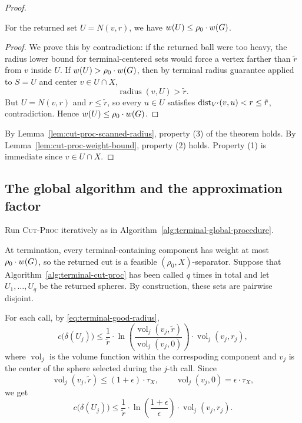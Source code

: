 \begin{proof}
\begin{lemma}\label{lem:cut-proc-weight-bound}
For the returned set $U=N(v,r)$,  we have $w\mathopen{}\left( U \right)\le \rho_0\cdot w\mathopen{}\left( G \right)$.
\end{lemma}
\begin{proof}
We prove this by contradiction: if the returned ball were too heavy, the radius lower bound for terminal-centered sets would force a vertex farther than $\tilde r$ from $v$ inside $U$.
If $w\mathopen{}\left( U \right)>\rho_0\cdot w\mathopen{}\left( G \right)$, then by terminal radius guarantee applied to $S=U$ and center $v\in U\cap X$,
\[
\operatorname{radius}(v,U)>\tilde r.
\]
But $U=N(v,r)$ and $r\le \tilde r$, so every $u\in U$ satisfies $\text{dist}_{V'}(v,u)<r\le \tilde r$, contradiction.
Hence $w\mathopen{}\left( U \right)\le \rho_0\cdot w\mathopen{}\left( G \right)$.
\end{proof}

By Lemma~\ref{lem:cut-proc-scanned-radius}, property (3) of the theorem holds. By Lemma~\ref{lem:cut-proc-weight-bound}, property (2) holds. Property (1) is immediate since $v\in U\cap X$.
\end{proof}

\subsection{The global algorithm and the approximation factor}

Run \textsc{Cut-Proc} iteratively as in Algorithm~\ref{alg:terminal-global-procedure}.



At termination, every terminal-containing component has weight at most $\rho_0\cdot w\mathopen{}\left( G \right)$, so the returned cut is a feasible $(\rho_0,X)$-separator.
Suppose that Algorithm~\ref{alg:terminal-cut-proc} has been called $q$ times in total and let $U_1,\dots,U_q$ be the returned spheres.
By construction, these sets are pairwise disjoint.

For each call, by \eqref{eq:terminal-good-radius},
\[
c\bigl(\delta(U_j)\bigr)
\le
\frac{1}{\tilde r}\cdot
\ln\left(\frac{\operatorname{vol}_j(v_j,\tilde r)}{\operatorname{vol}_j(v_j,0)}\right)\cdot
\operatorname{vol}_j(v_j,r_j),
\]
where $\operatorname{vol}_j$ is the volume function within the correspoding component and $v_j$ is the center of the sphere selected during the $j$-th call.
Since
\[
\operatorname{vol}_j(v_j,\tilde r)\le (1+\epsilon)\cdot\tau_X,
\qquad
\operatorname{vol}_j(v_j,0)=\epsilon\cdot\tau_X,
\]
we get
\[
c\bigl(\delta(U_j)\bigr)
\le
\frac{1}{\tilde r}\cdot\ln\left(\frac{1+\epsilon}{\epsilon}\right)\cdot
\operatorname{vol}_j(v_j,r_j).
\]

